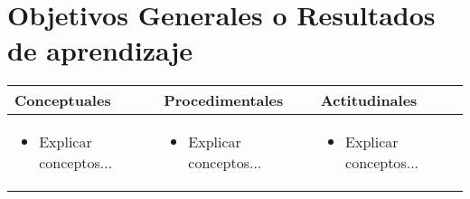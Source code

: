 \section{Objetivos Generales o Resultados de aprendizaje}

\begin{tabular}{@{}p{}p{}p{}@{}}
    \toprule
    \textbf{Conceptuales}                & \textbf{Procedimentales} & \textbf{Actitudinales} \\
    \midrule
    \begin{itemize}[nosep, leftmargin=*]
        \item Explicar conceptos...
    \end{itemize} &
    \begin{itemize}[nosep, leftmargin=*]
        \item Explicar conceptos...
    \end{itemize} &
    \begin{itemize}[nosep, leftmargin=*]
        \item Explicar conceptos...
    \end{itemize} \\
    \bottomrule
\end{tabular}

\pagebreak